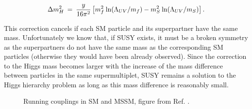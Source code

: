 \begin{equation}
\Delta m_H^2 \>=\> {y\over 16 \pi^2}
\left [ m_f^2
\> {\rm ln}(\Lambda_{UV}/m_f) 
- m_S^2
\> {\rm ln}(\Lambda_{UV}/m_S) 
\right ].
\label{eq:divhsusy}
\end{equation}

This correction cancels if each SM particle and its superpartner have the same mass. Unfortunately we know that, if SUSY exists, it must be a broken symmetry as the superpartners do not have the same mass as the corresponding SM particles (otherwise they would have been already observed). Since the correction to the Higgs mass becomes larger with the increase of the mass difference between particles in the same supermultiplet, SUSY remains a solution to the Higgs hierarchy problem as long as this mass difference is reasonably small.



\begin{figure}[ht]
\centering
{}
\caption{Running couplings in SM and MSSM, figure from Ref. \cite{Patrignani:2016xqp}.}
\label{fig:susy:gut}
\end{figure}

